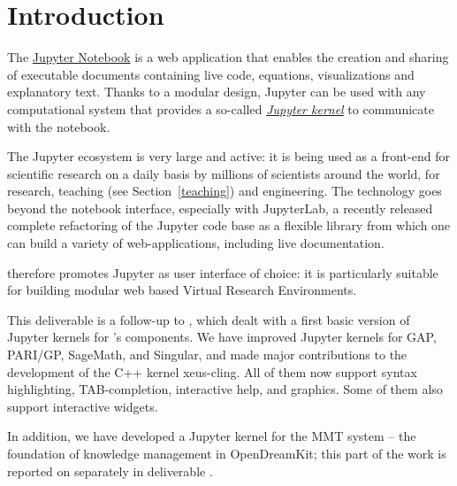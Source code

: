\documentclass{deliverablereport}
\author{Jeroen Demeyer, Sebastian Gutsche, Nicolas M.~Thiéry}
\begin{document}
\maketitle
\tableofcontents


\section{Introduction}

The \href{https://jupyter.org}{Jupyter Notebook} is a web application
that enables the creation and sharing of executable documents
containing live code, equations, visualizations and explanatory text.
Thanks to a modular design, Jupyter can be used with any computational
system that provides a so-called
\href{https://jupyter.readthedocs.io/en/latest/projects/kernels.html}{\emph{Jupyter kernel}}
to communicate with the notebook.

The Jupyter ecosystem is very large and active: it is being used as a
front-end for scientific research on a daily basis by millions of
scientists around the world, for research, teaching (see
Section~\ref{teaching}) and engineering. The technology goes beyond
the notebook interface, especially with JupyterLab, a recently
released complete refactoring of the Jupyter code base as a flexible
library from which one can build a variety of web-applications,
including live documentation.

\ODK therefore promotes Jupyter as user interface of choice:
it is particularly suitable for building modular web based Virtual Research Environments.

This deliverable is a follow-up to
, which dealt with a first basic
version of Jupyter kernels for \ODK's components. We have improved
Jupyter kernels for GAP, PARI/GP, SageMath, and Singular, and made
major contributions to the development of the C++ kernel xeus-cling.
All of them now support syntax highlighting, TAB-completion,
interactive help, and graphics. Some of them also support interactive
widgets.

In addition, we have developed a Jupyter kernel for the MMT system -- the
foundation of knowledge management in OpenDreamKit; this part of the
work is reported on separately in deliverable
.

\end{document}

